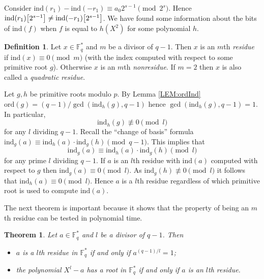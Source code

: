 \documentclass{article}
\let\originalleft\left
\let\originalright\right
\renewcommand{\left}{\mathopen{}\mathclose\bgroup\originalleft}
\renewcommand{\right}{\aftergroup\egroup\originalright}
\newcounter{dummy} \numberwithin{dummy}{section}
\theoremstyle{plain}
\newtheorem{thm}[dummy]{Theorem}
\theoremstyle{definition}
\newtheorem{mydef}[dummy]{Definition}
\def\FQ {{ \mathbb{F}^* _ {q} }}
\def\ind {{ \mathrm{ind} }}
\def\ord {{ \mathrm{ord} }}
\begin{document}
		Consider $\ind(r_1)-\ind(-r_1) \equiv {a_0}2^{s-1} \pmod {2^s}$. Hence $\ind(r_1)\left[2^{s-1} \right] \not= \ind(-r_1) \left[2^{s-1}\right]$. We have found some information about the bits of $\ind(f)$ when $f$ is equal to $h(X^2)$ for some polynomial $h$.
		
		\begin{mydef} 
		\label{DEF:nonresidue}
		    Let $x \in \FQ$ and $m$ be a divisor of $q-1$. Then $x$ is an $m$th \emph{residue} if $\ind(x) \equiv 0 \pmod m$ (with the index computed with respect to some primitive root $g$). Otherwise $x$ is an $m$th \emph{nonresidue}. If $m=2$ then $x$ is also called a \emph{quadratic residue}.	
		\end{mydef}
		Let $g,h$ be primitive roots modulo $p$. By Lemma \ref{LEM:ordInd} $\ord(g)=(q-1)/\gcd(\ind_h(g),q-1)$ hence $\gcd(\ind_h(g),q-1)=1$. In particular, 
		\[ \ind_h(g) \not\equiv 0 \pmod l \] 
		\noindent for any $l$ dividing $q-1$. Recall the ``change of basis'' formula $\ind_g(a) \equiv \ind_h(a) \cdot \ind_g(h) \pmod {q-1}$. This implies that 
		\[ \ind_g(a) \equiv \ind_h(a) \cdot \ind_g(h) \pmod {l} \]
		\noindent for any prime $l$ dividing $q-1$. If $a$ is an $l$th residue with $\ind(a)$ computed with respect to $g$ then $\ind_g(a) \equiv 0 \pmod l$. As $\ind_g(h) \not\equiv 0 \pmod {l}$ it follows that $\ind_h(a) \equiv 0 \pmod l$. Hence $a$ is a $l$th residue regardless of which primitive root is used to compute $\ind(a)$. 
		
		The next theorem is important because it shows that the property of being an $m$th residue can be tested in polynomial time. 
		
		\begin{thm} 
		\label{THM:RES}
		    Let $a \in \FQ$ and $l$ be a divisor of $q-1$. Then 
				\begin{itemize}
				\item $a$ is a $l$th residue in $\FQ$ if and only if $a^{(q-1)/l}=1$; 
				\item the polynomial $X^l-a$ has a root in $\FQ$ if and only if $a$ is an $l$th residue.
				\end{itemize}
		\end{thm}
		
\end{document}
